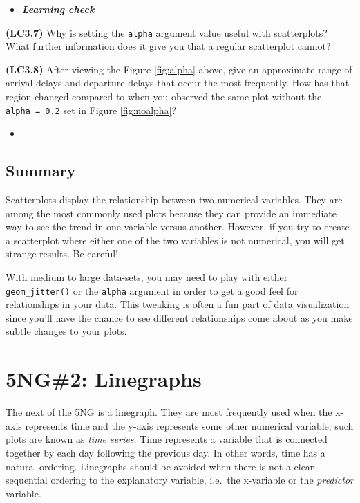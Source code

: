 \documentclass[12pt,]{krantz}
\newenvironment{rmdblock}[1]
  {\begin{shaded*}
  \begin{itemize}
  \renewcommand{\labelitemi}{
    \raisebox{-.7\height}[0pt][0pt]{
    }
  }
  \item
  }
  {
  \end{itemize}
  \end{shaded*}
  }
\newenvironment{learncheck}
  {\begin{rmdblock}{warning}}
  {\end{rmdblock}}
\begin{document}
\begin{learncheck}
\textbf{\emph{Learning check}}
\end{learncheck}

\textbf{(LC3.7)} Why is setting the \texttt{alpha} argument value useful
with scatterplots? What further information does it give you that a
regular scatterplot cannot?

\textbf{(LC3.8)} After viewing the Figure \ref{fig:alpha} above, give an
approximate range of arrival delays and departure delays that occur the
most frequently. How has that region changed compared to when you
observed the same plot without the \texttt{alpha\ =\ 0.2} set in Figure
\ref{fig:noalpha}?

\begin{learncheck}

\end{learncheck}

\subsection{Summary}\label{summary}

Scatterplots display the relationship between two numerical variables.
They are among the most commonly used plots because they can provide an
immediate way to see the trend in one variable versus another. However,
if you try to create a scatterplot where either one of the two variables
is not numerical, you will get strange results. Be careful!

With medium to large data-sets, you may need to play with either
\texttt{geom\_jitter()} or the \texttt{alpha} argument in order to get a
good feel for relationships in your data. This tweaking is often a fun
part of data visualization since you'll have the chance to see different
relationships come about as you make subtle changes to your plots.

\section{5NG\#2: Linegraphs}\label{linegraphs}

The next of the 5NG is a linegraph. They are most frequently used when
the x-axis represents time and the y-axis represents some other
numerical variable; such plots are known as \emph{time series}. Time
represents a variable that is connected together by each day following
the previous day. In other words, time has a natural ordering.
Linegraphs should be avoided when there is not a clear sequential
ordering to the explanatory variable, i.e.~the x-variable or the
\emph{predictor} variable.
\end{document}

